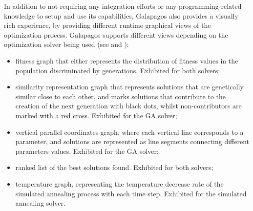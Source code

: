 In addition to not requiring any integration efforts or any programming-related knowledge to setup and use its capabilities, Galapagos also provides a visually rich experience, by providing different runtime graphical views of the optimization process. Galapagos supports different views depending on the optimization solver being used (see  and ):
\begin{itemize}
	\item fitness graph that either represents the distribution of fitness values in the population discriminated by generations. Exhibited for both solvers;
	\item similarity representation graph that represents solutions that are genetically similar close to each other, and marks solutions that contribute to the creation of the next generation with black dots, whilst non-contributors are marked with a red cross. Exhibited for the \ac{GA} solver;
	\item vertical parallel coordinates graph, where each vertical line corresponds to a parameter, and solutions are represented as line segments connecting different parameters values. Exhibited for the \ac{GA} solver;
	\item ranked list of the best solutions found. Exhibited for both solvers;
	\item temperature graph, representing the temperature decrease rate of the simulated annealing process with each time step. Exhibited for the simulated annealing solver.
\end{itemize}

